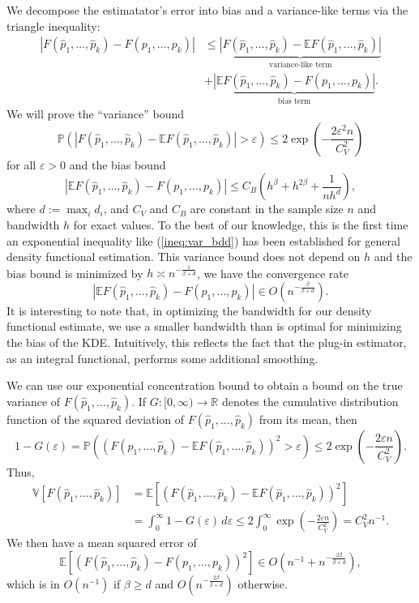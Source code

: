 \documentclass{article} %
\newcommand{\inv}{^{-1}}                            %
\newcommand{\R}{\mathbb{R}}                         %
\newcommand{\e}{\varepsilon}                        %
\newcommand{\E}{\mathbb{E}}                         %
\newcommand{\V}{\mathbb{V}}                         %
\newcommand{\pr}{\mathbb{P}}                        %
\begin{document}
We decompose the estimatator's error into bias and a variance-like terms via
the triangle inequality:
\begin{align*}
|F(\hat p_1,\dots,\hat p_k) - F(p_1,\dots,p_k)|
 &  \leq \underbrace{|F(\hat p_1,\dots,\hat p_k)
                                            - \E F(\hat p_1,\dots,\hat p_k)|}
        _{\text{variance-like term}}    \\
 &  + \underbrace{|\E F(\hat p_1,\dots,\hat p_k) - F(p_1,\dots,p_k)|}
        _{\text{bias term}}.
\end{align*}
We will prove the ``variance'' bound
\begin{equation}
\pr \left( |F(\hat p_1,\dots,\hat p_k)
                                - \E F(\hat p_1,\dots,\hat p_k)| > \e \right)
    \leq 2\exp \left( -\frac{2\e^2n}{C_V^2} \right)
\label{ineq:var_bdd}
\end{equation}
for all $\e > 0$ and the bias bound
\begin{equation}
|\E F(\hat p_1,\dots,\hat p_k) - F(p_1,\dots,p_k)|
    \leq C_B \left( h^\beta + h^{2\beta} + \frac{1}{nh^d} \right),
\label{ineq:bias_bdd}
\end{equation}
where $d := \max_i d_i$, and $C_V$ and $C_B$ are constant in the sample size
$n$ and bandwidth $h$ for exact values. To the best of our knowledge, this is
the first time an exponential inequality like (\ref{ineq:var_bdd}) has been
established for general density functional estimation. This variance bound does
not depend on $h$ and the bias bound is minimized by
$h \asymp n^{-\frac{1}{\beta + d}}$, we have the convergence rate
\[|\E F(\hat p_1,\dots,\hat p_k) - F(p_1,\dots,p_k)|
    \in O \left( n^{-\frac{\beta}{\beta + d}} \right).
\]
It is interesting to note that, in optimizing the bandwidth for our density
functional estimate, we use a smaller bandwidth than is optimal for minimizing
the bias of the KDE. Intuitively, this reflects the fact that the plug-in
estimator, as an integral functional, performs some additional smoothing.

We can use our exponential concentration bound to obtain a bound on the true
variance of $F(\hat p_1,\dots,\hat p_k)$. If $G : [0,\infty) \to \R$ denotes
the cumulative distribution function of the squared deviation of
$F(\hat p_1,\dots,\hat p_k)$ from its mean, then
\[1 - G(\e)
    = \pr \left( \left( F(\hat p_1,\dots,\hat p_k)
                        - \E F(\hat p_1,\dots,\hat p_k) \right)^2 > \e \right)
    \leq 2\exp \left( -\frac{2\e n}{C_V^2} \right).
\]
Thus,
\begin{align*}
\V[F(\hat p_1,\dots,\hat p_k)]
 &  = \E\left[ \left( F(\hat p_1,\dots,\hat p_k)
                        - \E F(\hat p_1,\dots,\hat p_k) \right)^2 \right]   \\
 &  = \int_0^\infty 1 - G(\e) \, d\e
    \leq 2\int_0^\infty \exp \left( -\frac{2\e n}{C_V^2} \right)
    = C_V^2n\inv.
\end{align*}
We then have a mean squared error of
\[\E \left[ \left( F(\hat p_1,\dots,\hat p_k)
                                        - F(p_1,\dots,p_k) \right)^2 \right]
    \in O \left( n\inv + n^{-\frac{2\beta}{\beta + d}} \right),
\]
which is in $O(n\inv)$ if $\beta \geq d$ and
$O \left( n^{-\frac{2\beta}{\beta + d}} \right)$ otherwise.
\end{document}
